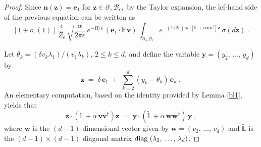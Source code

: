 \documentclass[reqno]{amsart}
\newcounter{as}[section]
\newcommand{\mc}[1]{{\mathcal #1}}
\newcommand{\bb}[1]{{\mathbb #1}}
\newcommand{\bs}[1]{{\boldsymbol #1}}
\newcommand{\<}{\langle}
\renewcommand{\>}{\rangle}
\begin{document}
\begin{proof}
Since $\bs{n}(\bs{z})=\bs{e}_{1}$ for
$\bs{z}\in\partial_{+}\mc{B}_{\epsilon},$ by the Taylor expansion, the
lef-hand side of the previous equation can be written as
\begin{equation}
\label{se94}
[1+o_{\epsilon}(1)]\,
\frac {\epsilon} {Z_{\epsilon}} \, \sqrt{\frac{\alpha}{2\pi\epsilon}}
\, e^{- H/\epsilon} \, (\bs{e}_{1}\cdot\bb{M}\bs{v})\,
\int_{\partial_{+}\mc{B}_{\epsilon}}
e^{- (1/2\epsilon) \, \bs{z}\cdot [ \bb{L}+\alpha\bs{v} \bs{v}^{\dagger} ] \bs{z}}
\, \sigma(d\bs{z})\;.
\end{equation}

Let $\theta_{k}=(\delta v_{k}\lambda_{1})/(v_{1}\lambda_{k})$, $2\le k\le d$,
and define the variable $\bs y = (y_{2},\,\dots,\,y_{d})$ by
\begin{equation*}
\bs{z}\;=\; \delta \,\bs{e}_{1} \;+\;
\sum_{k=2}^{d}(y_{k}-\theta_{k})\, \bs{e}_{k}\;,
\end{equation*}
An elementary computation, based on the identity provided by Lemma
\ref{bl1}, yields that
\begin{equation*}
\bs{z}\cdot\left(\bb{L}+\alpha\, \bs{v}\bs {v}^{\dagger}\right)\bs{z}
\;=\;\bs{y}\cdot (\widetilde{\bb{L}} +
\alpha \, {\bs w} {\bs w}^{\dagger})\, \bs{y}\;,
\end{equation*}
where ${\bs{w}}$ is the $(d-1)$-dimensional vector given by $\bs w =
(v_{2},\,\dots,\,v_{d})$ and $\widetilde{\bb{L}}$ is the
$(d-1)\times(d-1)$ diagonal matrix $\textup{diag }
(\lambda_{2},\,\dots,\,\lambda_{d})$.


\end{proof}
\end{document}
